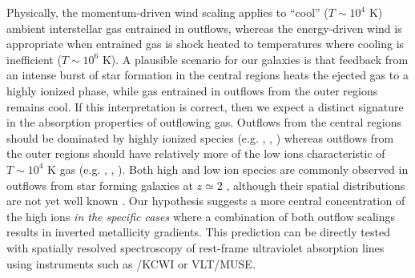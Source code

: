 Physically, the momentum-driven wind scaling applies to ``cool'' ($T \sim 10^4$ K) ambient interstellar gas entrained in outflows,
whereas the energy-driven wind is appropriate when entrained gas is shock heated to temperatures where cooling is inefficient ($T
\sim 10^6$ K). A plausible scenario for our galaxies is that feedback from an intense burst of star formation in the central
regions heats the ejected gas to a highly ionized phase, while gas entrained in outflows from the outer regions remains cool. If
this interpretation is correct, then we expect a distinct signature in the absorption properties of outflowing gas. Outflows from
the central regions should be dominated by highly ionized species (e.g. , , ) whereas
outflows from the outer regions should have relatively more of the low ions characteristic of $T \sim 10^4$ K gas (e.g.
, , ). Both high and low ion species are commonly observed in outflows from star forming
galaxies at $z\simeq2$ \citep{Berg:2018gd,Du:2018tr}, although their spatial distributions are not yet well known 
\citep[but see][]{James:2018km}.
Our hypothesis suggests a more central concentration of the high ions \emph{in the specific cases} where a 
combination of both outflow scalings results in inverted metallicity gradients.
This prediction can be directly tested with spatially resolved spectroscopy of rest-frame
ultraviolet absorption lines using instruments such as \keck/KCWI or VLT/MUSE.


